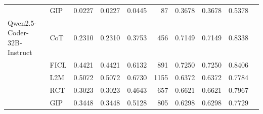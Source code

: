 \documentclass[conference]{IEEEtran}
\begin{document}
\begin{longtable}{p{3.5cm} l r r r r r r r r}
                    & GIP  & 0.0227 & 0.0227 & 0.0445 & 87 & 0.3678 & 0.3678 & 0.5378 \\ \addlinespace
Qwen2.5-Coder-32B-Instruct & CoT  & 0.2310 & 0.2310 & 0.3753 & 456 & 0.7149 & 0.7149 & 0.8338 \\
                           & FICL & 0.4421 & 0.4421 & 0.6132 & 891 & 0.7250 & 0.7250 & 0.8406 \\
                           & L2M  & 0.5072 & 0.5072 & 0.6730 & 1155 & 0.6372 & 0.6372 & 0.7784 \\
                           & RCT  & 0.3023 & 0.3023 & 0.4643 & 657 & 0.6621 & 0.6621 & 0.7967 \\
                           & GIP  & 0.3448 & 0.3448 & 0.5128 & 805 & 0.6298 & 0.6298 & 0.7729 \\

\end{longtable}
\end{document}
